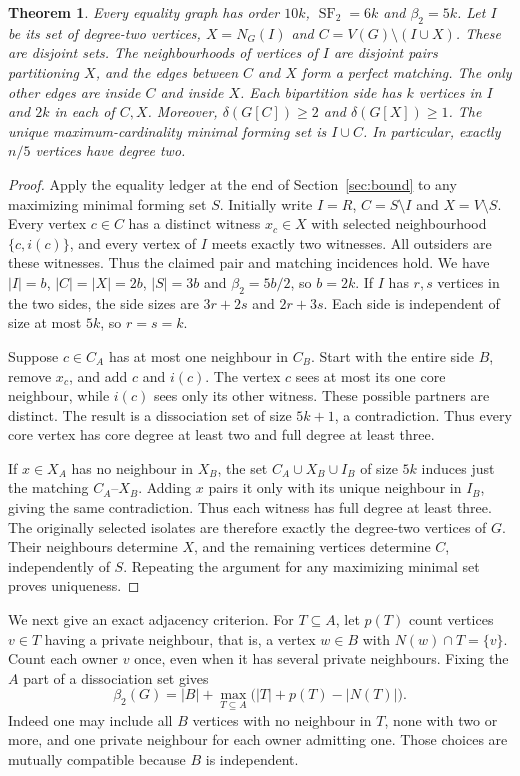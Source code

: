 \documentclass[11pt]{article}
\newtheorem{theorem}{Theorem}
\newcommand{\SF}{\operatorname{SF}_2}
\newcommand{\diss}{\beta_2}
\begin{document}
\begin{theorem}\label{thm:intrinsic}
Every equality graph has order $10k$, $\SF=6k$ and $\diss=5k$.
Let $I$ be its set of degree-two vertices, $X=N_G(I)$ and
$C=V(G)\setminus(I\cup X)$. These are disjoint sets. The neighbourhoods
of vertices of $I$ are disjoint pairs partitioning $X$, and the edges
between $C$ and $X$ form a perfect matching. The only other edges are
inside $C$ and inside $X$. Each bipartition side has $k$ vertices in
$I$ and $2k$ in each of $C,X$. Moreover,
$\delta(G[C])\ge2$ and $\delta(G[X])\ge1$.
The unique maximum-cardinality minimal forming set is $I\cup C$.
In particular, exactly $n/5$ vertices have degree two.
\end{theorem}
\begin{proof}
Apply the equality ledger at the end of Section~\ref{sec:bound} to any
maximizing minimal forming set $S$. Initially write $I=R$, $C=S\setminus I$
and $X=V\setminus S$. Every vertex $c\in C$ has a distinct witness
$x_c\in X$ with selected neighbourhood $\{c,i(c)\}$, and every vertex
of $I$ meets exactly two witnesses. All outsiders are these witnesses.
Thus the claimed pair and matching incidences hold. We have
$|I|=b$, $|C|=|X|=2b$, $|S|=3b$ and $\diss=5b/2$, so $b=2k$.
If $I$ has $r,s$ vertices in the two sides, the side sizes are
$3r+2s$ and $2r+3s$. Each side is independent of size at most $5k$,
so $r=s=k$.

Suppose $c\in C_A$ has at most one neighbour in $C_B$. Start with the
entire side $B$, remove $x_c$, and add $c$ and $i(c)$. The vertex $c$
sees at most its one core neighbour, while $i(c)$ sees only its other
witness. These possible partners are distinct. The result is a
dissociation set of size $5k+1$, a contradiction. Thus every core
vertex has core degree at least two and full degree at least three.

If $x\in X_A$ has no neighbour in $X_B$, the set
$C_A\cup X_B\cup I_B$ of size $5k$ induces just the matching
$C_A$--$X_B$. Adding $x$ pairs it only with its unique neighbour in
$I_B$, giving the same contradiction. Thus each witness has full
degree at least three. The originally selected isolates are therefore
exactly the degree-two vertices of $G$. Their neighbours determine
$X$, and the remaining vertices determine $C$, independently of $S$.
Repeating the argument for any maximizing minimal set proves uniqueness.
\end{proof}

We next give an exact adjacency criterion. For $T\subseteq A$, let
$p(T)$ count vertices $v\in T$ having a private neighbour, that is, a
vertex $w\in B$ with $N(w)\cap T=\{v\}$. Count each owner $v$ once,
even when it has several private neighbours. Fixing the $A$ part of a
dissociation set gives
\begin{equation}\label{eq:private}
 \diss(G)=|B|+\max_{T\subseteq A}\bigl(|T|+p(T)-|N(T)|\bigr).
\end{equation}
Indeed one may include all $B$ vertices with no neighbour in $T$, none
with two or more, and one private neighbour for each owner admitting one.
Those choices are mutually compatible because $B$ is independent.
\end{document}
